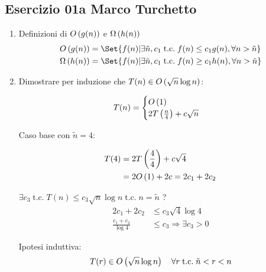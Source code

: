 
\subsection[01a MT]{Esercizio 01a Marco Turchetto}

\begin{enumerate}[label=\alph*)]
\item
	Definizioni di \( O\left(g(n)\right) \) e \( \Omega\left(h(n)\right) \) \\
	\begin{align*}
		\BigO{g(n)} &= \Set{f(n) | \exists \tilde{n}, c_1 \;\text{t.c.}\; f(n) \leq c_1 g(n), \forall n > \tilde{n}} \\ %
		\BigOmega{h(n)} &= \Set{ f(n) | \exists \tilde{n}, c_1\; \text{t.c.}\; f(n) \geq c_1 h(n), \forall n > \tilde{n}} \\
	\end{align*}

\item 
	Dimostrare per induzione che \( T(n) \in O\left(\sqrt{n} \log n\right) \):

	\begin{equation*}
		T(n)=
		\begin{cases}
			O\left(1\right) \\
			2T \left(\frac{n}{4} \right) + c \sqrt{n} \\
		\end{cases}
	\end{equation*}
	
	Caso base con $\tilde{n} = 4$:
	
	\begin{align*}
		T(4) &= 2T \left(\frac{4}{4} \right) + c \sqrt{4} \\
			 &= 2 O\left(1\right) + 2c = 2c_1 + 2c_2 \\
	\end{align*}
	
	\( \exists c_3 \;\text{t.c.}\; T(n) \leq c_3 \sqrt{n} \log n \;\text{t.c.}\; n = \tilde{n} \) ? \\
	
	\begin{align*}
		2c_1 + 2c_2 &\leq c_3 \sqrt{4} \log 4 \\
		\frac{c_1 + c_2}{\log 4} &\leq c_3 \Rightarrow \exists c_3 > 0
	\end{align*}
	
	Ipotesi induttiva:\\
	\[
		T(r) \in O\left(\sqrt{n} \log n\right)\quad \forall r \;\text{t.c.}\; \tilde{n} < r < n
	\]
	

\end{enumerate}
